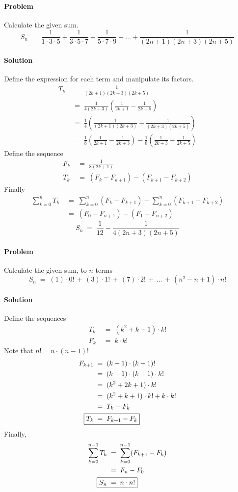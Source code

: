 \documentclass[a4paper, 11pt, reqno]{article}
\newcounter{prob}
\def\problem{\stepcounter{prob}\paragraph{Problem \arabic{prob}}}
\def\solution{\paragraph{Solution}}
\begin{document}
	\problem
	Calculate the given sum.
	\begin{equation*}
		S_n \; = \;  \frac{1}{1\cdot 3\cdot 5} + \frac{1}{3\cdot 5\cdot 7} + \frac{1}{5\cdot 7\cdot 9} + \dots + \frac{1}{(2n + 1)(2n + 3)(2n + 5)}
	\end{equation*}
	\solution
	Define the expression for each term and manipulate its factors.
	\begin{align*}
		T_k	\; &= \; \frac{1}{(2k + 1)(2k + 3)(2k + 5)}	\\
			\; &= \; \frac{1}{4(2k + 3)}\left( \frac{1}{2k + 1} - \frac{1}{2k + 5} \right) \\
			\; &= \; \frac{1}{4} \left( \frac{1}{(2k + 1)(2k + 3)} - \frac{1}{(2k + 3)(2k + 5)}\right)	\\
			\; &= \; \frac{1}{8} \left( \frac{1}{2k + 1} - \frac{1}{2k + 3} \right) 
				-\frac{1}{8} \left( \frac{1}{2k + 3} - \frac{1}{2k + 5} \right)
	\end{align*}
	Define the sequence
	\begin{align*}
		F_k	\; &= \; \frac{1}{8 (2k + 1)}	\\
		T_k	\; &= \; (F_k - F_{k + 1}) - (F_{k + 1} - F_{k + 2})
	\end{align*}
	Finally
	\begin{align*}
		\sum_{k=0}^{n} T_k 
			\; &= \; \sum_{k=0}^{n} (F_k - F_{k + 1}) - \sum_{k=0}^{n} (F_{k + 1} - F_{k + 2}) \\
			\; &= \; (F_0 - F_{n + 1}) - (F_1 - F_{n + 2})
	\end{align*}
	\begin{equation*}
		\boxed{ S_n \; = \;  \frac{1}{12} - \frac{1}{4(2n + 3)(2n + 5)} }
	\end{equation*}
	
	\clearpage
	\problem
	Calculate the given sum, to $n$ terms
	\begin{equation*}
		S_n  \;=\;  (1)\cdot 0! \,+\, (3)\cdot 1! \,+\, (7)\cdot 2! \,+\, \dots \,+\, (n^2 - n + 1)\cdot n!
	\end{equation*}
	\solution
	Define the sequences
	\begin{align*}
		T_k  \; &= \;  (k^2 + k + 1)\cdot k! \\
		F_k  \; &= \;  k\cdot k!
	\end{align*}
	Note that $n! = n\cdot (n-1)!$
	\begin{align*}
		F_{k+1}  \; &= \; (k + 1)\cdot (k + 1)! \\
			 \; &= \; (k + 1)\cdot (k + 1)\cdot k! \\
			 \; &= \; (k^2 + 2k + 1)\cdot k! \\
			 \; &= \; (k^2 + k + 1)\cdot k! + k\cdot k! \\
			 \; &= \; T_k + F_k \\
		\Aboxed{T_k \; &= \;  F_{k+1} - F_{k}}
	\end{align*}
	Finally,
	\begin{align*}
		\sum_{k=0}^{n-1} T_k
		 	\; &= \; \sum_{k=0}^{n-1} (F_{k+1} - F_{k}) \\
			\; &= \; F_n - F_0 \\
		\Aboxed{S_n	\; &= \;  n\cdot n!}
	\end{align*}
	
\end{document}
